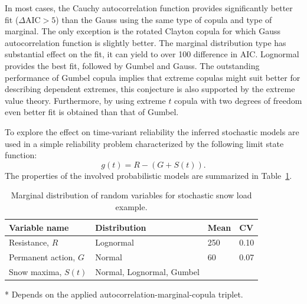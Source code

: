 In most cases, the Cauchy autocorrelation function provides significantly better fit ($\Delta \mathrm{AIC} > 5$) than the Gauss using the same type of copula and type of marginal. The only exception is the rotated Clayton copula for which Gauss autocorrelation function is slightly better. The marginal distribution type has substantial effect on the fit, it can yield to over 100 difference in AIC. Lognormal provides the best fit, followed by Gumbel and Gauss.
The outstanding performance of Gumbel copula implies that extreme copulas might suit better for describing dependent extremes, this conjecture is also supported by the extreme value theory. Furthermore, by using extreme $t$ copula with two degrees of freedom even better fit is obtained than that of Gumbel.

To explore the effect on time-variant reliability the inferred stochastic models are used in a simple reliability problem characterized by the following limit state function:
\begin{equation}
	g(t) = R - \left( {G + S(t)} \right).
\end{equation}
The properties of the involved probabilistic models are summarized in Table~\ref{tab:prob_models_snow_stoch}.

\begin{table}[htbp!]
\caption{Marginal distribution of random variables for stochastic snow load example.}
\centering
\label{tab:prob_models_snow_stoch}
\small
	\begin{threeparttable}
    \begin{tabular}{llll}
    \toprule
    Variable name  & Distribution & Mean & CV \\
    \midrule
    \rowcolor{lightgrey} Resistance, $R$  & Lognormal & 250 & 0.10  \\
    Permanent action, $G$  & Normal & 60 & 0.07  \\
    \rowcolor{lightgrey} Snow maxima, $S(t)$  & Normal, Lognormal, Gumbel & \tnote{*} & \tnote{*}  \\
    \bottomrule
    \end{tabular}
    \begin{tablenotes}
    	\item[*] Depends on the applied autocorrelation-marginal-copula triplet.  
   	\end{tablenotes}
   	\end{threeparttable}
\end{table}

